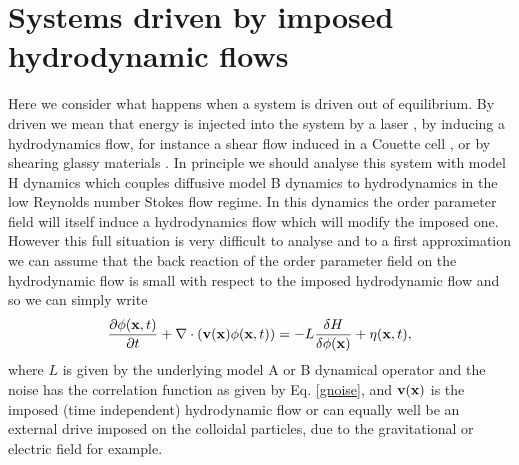 %


    \section{Systems driven by imposed hydrodynamic flows}

Here we consider what happens when a system is driven out of equilibrium. By driven we mean that energy is injected into the system by a laser \cite{girot_conical_2019}, by inducing a hydrodynamics flow, for instance a shear flow induced in a Couette cell \cite{derks_suppression_2006}, {\color{purple}or by shearing glassy materials} \cite{berthier_nonequilibrium_2002,berthier_shearing_2002}. In principle we should analyse this system with model H dynamics which couples diffusive model B dynamics to hydrodynamics in the low Reynolds number Stokes flow regime. In this dynamics the order parameter field will itself induce a hydrodynamics flow which will modify
the imposed one. However this full situation is very difficult to analyse and to a first approximation we can assume that the back reaction of the order parameter field on the hydrodynamic flow is small with respect to the imposed hydrodynamic flow and so we can simply write
\begin{equation}
    \frac{\partial \phi ({\bf x},t)}{\partial t} + \nabla\cdot({\bf  v}({\bf x})\phi({\bf x},t)) =- L\frac{\delta H}{\delta \phi({\bf x})} + \eta({\bf x},t),
    \label{drive}
\end{equation}
where $L$ is given by the underlying model A or B dynamical operator and the noise has the correlation function as given by Eq. \eqref{gnoise}, and ${\bf v}({\bf x})$ is the imposed (time independent) hydrodynamic flow or can equally well be an external drive imposed on the colloidal particles, due to the gravitational or electric field for example. 

